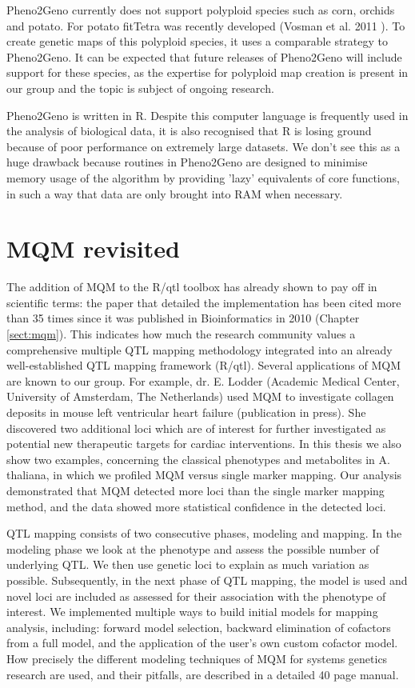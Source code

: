 Pheno2Geno currently does not support polyploid species such as corn, orchids and potato. For potato fitTetra was recently developed 
(Vosman et al. 2011 \cite{Voorrips:2011}). To create genetic maps of this polyploid species, it uses a comparable strategy to Pheno2Geno. It can be expected 
that future releases of Pheno2Geno will include support for these species, as the expertise for polyploid map creation is present in 
our group and the topic is subject of ongoing research. 

Pheno2Geno is written in R. Despite this computer language is frequently used in the analysis of biological data, it is also recognised 
that R is losing ground because of poor performance on extremely large datasets. We don't see this as a huge drawback because 
routines in Pheno2Geno are designed to minimise memory usage of the algorithm by providing 'lazy' equivalents of core functions, in such 
a way that data are only brought into RAM when necessary.

\section{MQM revisited}
The addition of MQM to the R/qtl toolbox has already shown to pay off in scientific terms: the paper that detailed the implementation 
has been cited more than 35 times since it was published in Bioinformatics in 2010 (Chapter \ref{sect:mqm}). This indicates how much the research 
community values a comprehensive multiple QTL mapping methodology integrated into an already well-established QTL mapping framework 
(R/qtl). Several applications of MQM are known to our group. For example, dr. E. Lodder (Academic Medical Center, University of 
Amsterdam, The Netherlands) used MQM to investigate collagen deposits in mouse left ventricular heart failure (publication in press). 
She discovered two additional loci which are of interest for further investigated as potential new therapeutic targets for cardiac 
interventions. In this thesis we also show two examples, concerning the classical phenotypes and metabolites in A. thaliana, in which 
we profiled MQM versus single marker mapping. Our analysis demonstrated that MQM detected more loci than the single marker mapping 
method, and the data showed more statistical confidence in the detected loci.

QTL mapping consists of two consecutive phases, modeling and mapping. In the modeling phase we look at the phenotype and assess the 
possible number of underlying QTL. We then use genetic loci to explain as much variation as possible. Subsequently, in the next phase 
of QTL mapping, the model is used and novel loci are included as assessed for their association with the phenotype of interest. We 
implemented multiple ways to build initial models for mapping analysis, including: forward model selection, backward elimination of 
cofactors from a full model, and the application of the user's own custom cofactor model. How precisely the different modeling 
techniques of MQM for systems genetics research are used, and their pitfalls, are described in a detailed 40 page manual.

